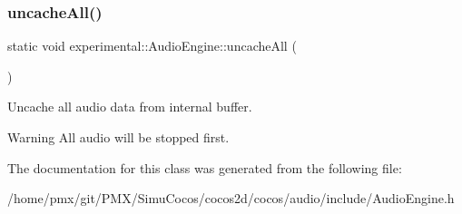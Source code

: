 \subsubsection{\texorpdfstring{uncache\+All()}{uncacheAll()}\hspace{0.1cm}{\footnotesize\ttfamily [2/2]}}
{\footnotesize\ttfamily static void experimental\+::\+Audio\+Engine\+::uncache\+All (\begin{DoxyParamCaption}{ }\end{DoxyParamCaption})\hspace{0.3cm}{\ttfamily [static]}}

Uncache all audio data from internal buffer.

\begin{DoxyWarning}{Warning}
All audio will be stopped first. 
\end{DoxyWarning}


The documentation for this class was generated from the following file\+:\begin{DoxyCompactItemize}
\item 
/home/pmx/git/\+P\+M\+X/\+Simu\+Cocos/cocos2d/cocos/audio/include/Audio\+Engine.\+h\end{DoxyCompactItemize}
